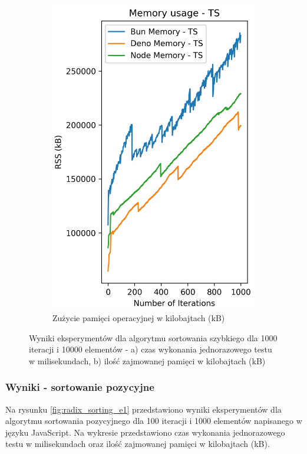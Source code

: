 \begin{figure}[H]
\begin{subfigure}[b]{0.4\textwidth}
    \includegraphics[width=\textwidth]{Figures/sorting/sorting_quick_1000_10000_ts_memory.png}
    \caption{Zużycie pamięci operacyjnej w kilobajtach (kB)}
    \label{fig:quick_sorting_e4_ts_memory}
  \end{subfigure}
  \caption{Wyniki eksperymentów dla algorytmu sortowania szybkiego dla 1000 iteracji i 10000 elementów - a) czas wykonania jednorazowego testu w milisekundach, b) ilość zajmowanej pamięci w kilobajtach (kB)}
  \label{fig:quick_sorting_e4_ts}
\end{figure}

\subsubsection{Wyniki - sortowanie pozycyjne}
Na rysunku \ref{fig:radix_sorting_e1} przedstawiono wyniki eksperymentów dla algorytmu sortowania pozycyjnego dla 100 iteracji i 1000 elementów napisanego w języku JavaScript. Na wykresie przedstawiono czas wykonania jednorazowego testu w milisekundach oraz ilość zajmowanej pamięci w kilobajtach (kB).

